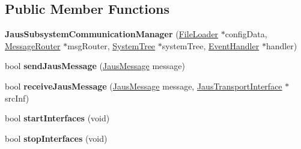 \subsection*{\-Public \-Member \-Functions}
\begin{DoxyCompactItemize}
\item 
\hypertarget{class_jaus_subsystem_communication_manager_a1e93a0142256c059101c5141b4e522fa}{{\bfseries \-Jaus\-Subsystem\-Communication\-Manager} (\hyperlink{class_file_loader}{\-File\-Loader} $\ast$config\-Data, \hyperlink{class_message_router}{\-Message\-Router} $\ast$msg\-Router, \hyperlink{class_system_tree}{\-System\-Tree} $\ast$system\-Tree, \hyperlink{class_event_handler}{\-Event\-Handler} $\ast$handler)}\label{class_jaus_subsystem_communication_manager_a1e93a0142256c059101c5141b4e522fa}

\item 
\hypertarget{class_jaus_subsystem_communication_manager_a27ae7bf213b9b98b568728ebdac961c6}{bool {\bfseries send\-Jaus\-Message} (\hyperlink{struct_jaus_message_struct}{\-Jaus\-Message} message)}\label{class_jaus_subsystem_communication_manager_a27ae7bf213b9b98b568728ebdac961c6}

\item 
\hypertarget{class_jaus_subsystem_communication_manager_a01af2d93eca8072ae9048615f8218796}{bool {\bfseries receive\-Jaus\-Message} (\hyperlink{struct_jaus_message_struct}{\-Jaus\-Message} message, \hyperlink{class_jaus_transport_interface}{\-Jaus\-Transport\-Interface} $\ast$src\-Inf)}\label{class_jaus_subsystem_communication_manager_a01af2d93eca8072ae9048615f8218796}

\item 
\hypertarget{class_jaus_subsystem_communication_manager_a16d1a4082c046338fecf93a70288f302}{bool {\bfseries start\-Interfaces} (void)}\label{class_jaus_subsystem_communication_manager_a16d1a4082c046338fecf93a70288f302}

\item 
\hypertarget{class_jaus_subsystem_communication_manager_accf91bd66aa0cc039329101001bcd8e3}{bool {\bfseries stop\-Interfaces} (void)}\label{class_jaus_subsystem_communication_manager_accf91bd66aa0cc039329101001bcd8e3}

\end{DoxyCompactItemize}
